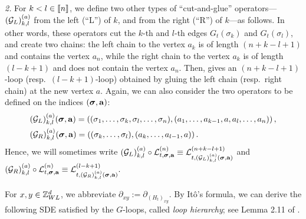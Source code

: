 \begin{definition}
 \noindent 
 \emph{2.}  For $k < l \in \llbracket{n}\rrbracket$, we define two other types of ``cut-and-glue'' operators---${(\mathcal{G}_L)}^{(a)}_{k,l}$ from the left (``L'') of $k$, and  from the right (``R'') of $k$---as follows. 
 In other words, these operators cut the $k$-th and $l$-th edges $G_t(\sigma_k)$ and $G_t(\sigma_l)$, and create two chains: the left chain to the vertex $a_k$ is of length $(n+k-l+1)$ and contains the vertex $a_n$, while the right chain to the vertex $a_k$ is of length $(l-k+1)$ and does not contain the vertex $a_n$.  
Then,  gives an $(n+k-l+1)$-loop (resp.~$(l-k+1)$-loop) obtained by gluing the left chain (resp.~right chain) at the new vertex $a$.
Again, we can also consider the two operators to be defined on the indices $({\boldsymbol{\sigma}},{\mathbf{a}})$: 
\begin{align*}
    &{(\mathcal{G}_L)}^{(a)}_{k,l} ({\boldsymbol{\sigma}}, {\mathbf{a}}) = \left((\sigma_1,\ldots, \sigma_k,\sigma_l ,\ldots, \sigma_n ),(a_1,\ldots, a_{k-1}, a,a_l,\ldots, a_n )\right),\\
    &{(\mathcal{G}_R)}^{(a)}_{k,l} ({\boldsymbol{\sigma}}, {\mathbf{a}}) = \left((\sigma_k,\ldots, \sigma_l),(a_k,\ldots, a_{l-1}, a)\right).
\end{align*}
Hence, we will sometimes write 
    ${(\mathcal{G}_L)}^{(a)}_{k,l} \circ {\mathcal L}^{(n)}_{t, {\boldsymbol{\sigma}}, {\mathbf{a}}}\equiv 
     {\mathcal L}^{(n+k-l+1)}_{t,   {(\mathcal{G}_L)}^{(a)}_{k,l} ({\boldsymbol{\sigma}}, {\mathbf{a}})}$ and $ {(\mathcal{G}_R)}^{(a)}_{k,l} \circ {\mathcal L}^{(n)}_{t, {\boldsymbol{\sigma}}, {\mathbf{a}}}\equiv 
     {\mathcal L}^{(l-k+1)}_{t,  {(\mathcal{G}_R)}^{(a)}_{k,l} ({\boldsymbol{\sigma}}, {\mathbf{a}})}.$
\end{definition}

    



 

For $x,y\in {\mathbb Z}_{WL}^d$, we abbreviate $\partial_{xy}:=\partial_{(H_t)_{xy}}$. By It\^o's formula, we can derive the following SDE satisfied by the $G$-loops, called \emph{loop hierarchy}; see Lemma 2.11 of \cite{YY_25}.  


